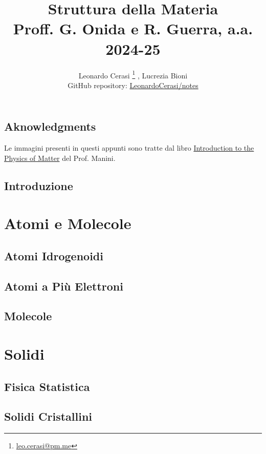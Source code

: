 \documentclass[a4paper, 12pt]{book}
\title{\Huge\textbf{Struttura della Materia} \\ \large Proff. G. Onida e R. Guerra, a.a. 2024-25}
\author{Leonardo Cerasi%
	\thanks{\scriptsize\href{mailto:leonardo.cerasi@studenti.unimi.it}{leo.cerasi@pm.me}}%
	, Lucrezia Bioni\\
	\small GitHub repository: \href{https://github.com/LeonardoCerasi/notes}{LeonardoCerasi/notes}}
\begin{document}
\frontmatter

\maketitle
\tableofcontents
\pagestyle{indice}

\chapter{Aknowledgments}
Le immagini presenti in questi appunti sono tratte dal libro \href{https://link-springer-com.pros1.lib.unimi.it/book/10.1007/978-3-319-14382-8}{Introduction to the Physics of Matter} del Prof. Manini.

\mainmatter

\chapter*{Introduzione}
\pagestyle{introd}


\part{Atomi e Molecole}
\pagestyle{body}

\chapter{Atomi Idrogenoidi}


\chapter{Atomi a Più Elettroni}


\chapter{Molecole}


\part{Solidi}
\pagestyle{body}

\chapter{Fisica Statistica}


\chapter{Solidi Cristallini}

\end{document}
